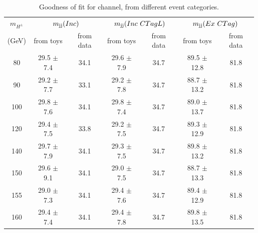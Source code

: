 \begin{table}
\caption{Goodness of fit for \ejets channel, from different event categories.}
\label{tab:gofEle}
\centering
\begin{adjustbox}{max width=\textwidth}
\begin{tabular}{ ccccccc}
\hline
\hline
\multicolumn{1}{c}{{\bf{$m_{H^\pm}$}}} & \multicolumn{2}{c}{$m_\text{jj}(Inc)$} & \multicolumn{2}{c}{$m_\text{jj}(Inc ~CTagL)$} & \multicolumn{2}{c}{$m_\text{jj}(Ex ~CTag)$} \\

(GeV) & from toys & from data & from toys & from data & from toys & from data  \\
 \hline
\hline
80  & 29.5 $\pm$ 7.4 & 34.1 & 29.6 $\pm$ 7.9 & 34.7 & 89.5 $\pm$ 12.8 & 81.8\\
  
90  & 29.2 $\pm$ 7.7 & 33.1 & 29.2 $\pm$ 7.8 & 34.7 & 88.7 $\pm$ 13.2 & 81.8\\
  
100  & 29.8 $\pm$ 7.6 & 34.1 & 29.8 $\pm$ 7.4 & 34.7 & 89.0 $\pm$ 13.7 & 81.8\\
  
120  & 29.4 $\pm$ 7.5 & 33.8 & 29.2 $\pm$ 7.5 & 34.7 & 89.3 $\pm$ 12.9 & 81.8\\
  
140  & 29.7 $\pm$ 7.9 & 34.1 & 29.3 $\pm$ 7.5 & 34.7 & 89.8 $\pm$ 13.2 & 81.8\\
  
150  & 29.6 $\pm$ 9.1 & 34.1 & 29.0 $\pm$ 7.5 & 34.7 & 88.7 $\pm$ 13.3 & 81.8\\
  
155  & 29.0 $\pm$ 7.3 & 34.1 & 29.4 $\pm$ 7.6 & 34.7 & 89.4 $\pm$ 12.9 & 81.8\\
  
160  & 29.4 $\pm$ 7.4 & 34.1 & 29.4 $\pm$ 7.8 & 34.7 & 89.8 $\pm$ 13.5 & 81.8\\
\hline
\end{tabular}
\end{adjustbox}
\end{table}

